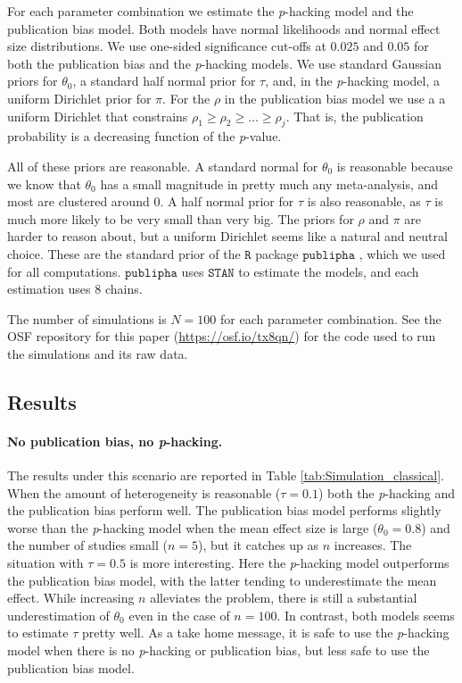 \documentclass[useAMS,usenatbib,referee]{biom}
\begin{document}
For each parameter combination we estimate the \textit{p}-hacking model and the publication bias model. Both models have normal likelihoods and normal effect size distributions. We use one-sided significance cut-offs at $0.025$ and $0.05$ for both the publication bias and the \textit{p}-hacking models. We use standard Gaussian priors for $\theta_0$, a standard half normal prior for $\tau$, and, in the \textit{p}-hacking model, a uniform Dirichlet prior for $\pi$. For the $\rho$ in the publication bias model we use a a uniform Dirichlet that constrains $\rho_{1}\geq\rho_{2}\geq\ldots\geq\rho_{j}$. That is, the publication probability is a decreasing function of the \textit{p}-value.

All of these priors are reasonable. A standard normal for $\theta_0$ is reasonable because we know that $\theta_0$ has a small magnitude in pretty much any meta-analysis, and most are clustered around $0$. A half normal prior for $\tau$ is also reasonable, as $\tau$ is much more likely to be very small than very big. The priors for $\rho$ and $\pi$ are harder to reason about, but a uniform Dirichlet seems like a natural and neutral choice. These are the standard prior of the $\mathtt{R}$ package $\mathtt{publipha}$ \citep{publipha}, which we used for all computations. $\mathtt{publipha}$ uses $\mathtt{STAN}$ \citep{Carpenter2017-cf} to estimate the models, and each estimation uses $8$ chains.

The number of simulations is $N = 100$ for each parameter combination. See the OSF repository for this paper (\url{https://osf.io/tx8qn/}) for the code used to run the simulations and its raw data.

\subsection{Results}
\paragraph{No publication bias, no \textit{p}-hacking.} The results under this scenario are reported in Table \ref{tab:Simulation_classical}. When the amount of heterogeneity is reasonable ($\tau = 0.1$) both the \textit{p}-hacking and the publication bias perform well. The publication bias model performs slightly worse than the \textit{p}-hacking model when the mean effect size is large ($\theta_0 = 0.8$) and the number of studies small ($n=5$), but it catches up as $n$ increases. The situation with $\tau = 0.5$ is more interesting. Here the \textit{p}-hacking model outperforms the publication bias model, with the latter tending to underestimate the mean effect. While increasing $n$ alleviates the problem, there is still a substantial underestimation of $\theta_0$ even in the case of $n = 100$. In contrast, both models seems to estimate $\tau$ pretty well. As a take home message, it is safe to use the \textit{p}-hacking model when there is no \textit{p}-hacking or publication bias, but less safe to use the publication bias model.
\end{document}

